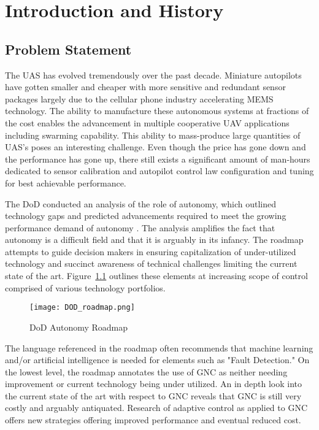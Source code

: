 \chapter{Introduction and History}\label{ch:intro}

\section{Problem Statement}
The \ac{UAS} has evolved tremendously over the past decade.  Miniature autopilots have gotten smaller and cheaper with more sensitive and redundant sensor packages largely due to the cellular phone industry accelerating \ac{MEMS} technology.  The ability to manufacture these autonomous systems at fractions of the cost enables the advancement in multiple cooperative UAV applications including swarming capability.  This ability to mass-produce large quantities of \ac{UAS}'s poses an interesting challenge.  Even though the price has gone down and the performance has gone up, there still exists a significant amount of man-hours dedicated to sensor calibration and autopilot control law configuration and tuning for best achievable performance.  

The \ac{DoD} conducted an analysis of the role of autonomy, which outlined technology gaps and predicted advancements required to meet the growing performance demand of autonomy \cite{dodroadmap}.  The analysis amplifies the fact that autonomy is a difficult field and that it is arguably in its infancy.  The roadmap attempts to guide decision makers in ensuring capitalization of under-utilized technology and succinct awareness of technical challenges limiting the current state of the art.  Figure~\ref{fig:dod_roadmap} outlines these elements at increasing scope of control comprised of various technology portfolios.  
\begin{figure}[h!]
 \centering
  \texttt{[image: DOD\_roadmap.png]}
  \caption{DoD Autonomy Roadmap \cite{dodroadmap}}
  \label{fig:dod_roadmap}
\end{figure}
The language referenced in the roadmap often recommends that machine learning and/or artificial intelligence is needed for elements such as "Fault Detection."  On the lowest level, the roadmap annotates the use of \ac{GNC} as neither needing improvement or current technology being under utilized.  An in depth look into the current state of the art with respect to \ac{GNC} reveals that \ac{GNC} is still very costly and arguably antiquated.  Research of adaptive control as applied to \ac{GNC} offers new strategies offering improved performance and eventual reduced cost.

